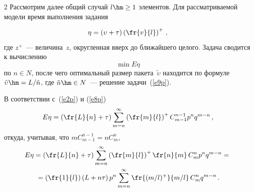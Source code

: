 \begin{multicols}{2}
     Рассмотрим далее общий случай $l\hm\geq 1$ элементов.
Для рассматриваемой модели время выполнения задания

\noindent
     \begin{equation}
     \eta=\left(\upsilon+\tau\right) \left(\fr{v}{l}\right)^+\,,
     \label{e8p}
     \end{equation}
где $z^+$~---  величина~$z$, округленная вверх до ближайшего целого. 
Задача сводится к вычислению
\begin{equation}
\min E\eta
\label{e9p}
\end{equation}
по $n\in N$, после чего оптимальный размер пакета~$\tilde{\upsilon}$ находится 
по формуле $\tilde\upsilon\hm=L/\tilde{n}$, где $\tilde{n}\hm\in N$~--- решение 
задачи~(\ref{e9p}). 

\pagebreak
     
     В соответствии с~(\ref{e2p}) и (\ref{e8p})
     $$
     E\eta =\left( \fr{L}{n}+\tau\right) \sum\limits_{m=n}^\infty 
     \left (\fr{m}{l}\right)^+ C_{m-1}^{n-
1} p^n q^{m-n}\,,
     $$
откуда, учитывая, что $m C_{m-1}^{n-1}=nC_m^n$,
\begin{multline}
E\eta = \left( \fr{L}{n}+\tau\right) \sum\limits_{m=n}^\infty 
\left (\fr{m}{l}\right)^+ \fr{n}{m}\,C_m^n 
p^n q^{m-n}={}\\
{}=\left( \fr{1}{l}\right) \left( L+n\tau\right) p^n \sum\limits_{m=n}^\infty 
\fr{(m/l)^+}{m/l}\,C_m^n q^{m-n}\,.
\label{e10p}
\end{multline}


\end{multicols}
